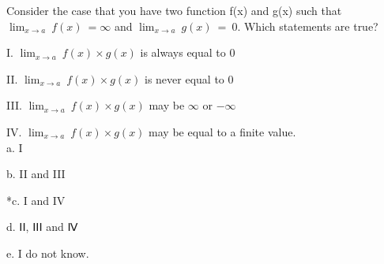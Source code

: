 
Consider the case that you have two function f(x) and g(x) such that
$\displaystyle \lim_{x \rightarrow a}\ f(x)\  = \infty$ and
$\displaystyle \lim_{x \rightarrow a}\ g(x)\  = \ 0$. Which statements are true?

I. $\displaystyle \lim_{x \rightarrow a}\ f(x) \times g(x)$ is always equal to 0

II. $\displaystyle \lim_{x \rightarrow a}\ f(x) \times g(x)$ is never equal to 0

III. $\displaystyle \lim_{x \rightarrow a}\ f(x) \times g(x)$ may be $\infty$ or
$-\infty$

IV. $\displaystyle \lim_{x \rightarrow a}\ f(x) \times g(x)$ may be equal to a finite
value.\\

a. I

b. II and III

*c. I and IV

d. ⅠⅠ, ⅠⅠⅠ and Ⅳ

e. I do not know.\\

